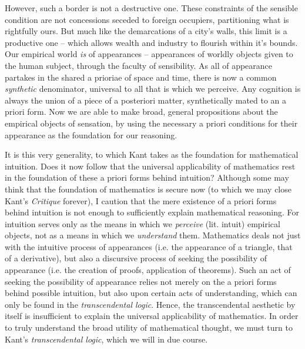 \noindent
However, such a border is not a destructive one. These constraints of the sensible condition are not concessions seceded to foreign occupiers, partitioning what is rightfully ours. But much like the demarcations of a city's walls, this limit is a productive one -- which allows wealth and industry to flourish within it's bounds. Our empirical world \emph{is} of appearances -- appearances of worldly objects given to the human subject, through the faculty of sensibility. As all of appearance partakes in the shared a prioriae of space and time, there is now a common \emph{synthetic} denominator, universal to all that is which we perceive. Any cognition is always the union of a piece of a posteriori matter, synthetically mated to an a priori form. Now we are able to make broad, general propositions about the empirical objects of sensation, by using the necessary a priori conditions for their appearance as the foundation for our reasoning.

\noindent
It is this very generality, to which Kant takes as the foundation for mathematical intuition. Does it now follow that the universal applicability of mathematics rest in the foundation of these a priori forms behind intuition? Although some may think that the foundation of mathematics is secure now (to which we may close Kant's \emph{Critique} forever), I caution that the mere existence of a priori forms behind intuition is not enough to sufficiently explain mathematical reasoning. For intuition serves only as the means in which we \emph{perceive} (lit. intuit) empirical objects, not as a means in which we \emph{understand} them. Mathematics deals not just with the intuitive process of appearances (i.e. the appearance of a triangle, that of a derivative), but also a discursive process of seeking the possibility of appearance (i.e. the creation of proofs, application of theorems). Such an act of seeking the possibility of appearance relies not merely on the a priori forms behind possible intuition, but also upon certain acts of understanding, which can only be found in the \emph{transcendental logic}. Hence, the transcendental aesthetic by itself is insufficient to explain the universal applicability of mathematics. In order to truly understand the broad utility of mathematical thought, we must turn to Kant's \emph{transcendental logic}, which we will in due course.

